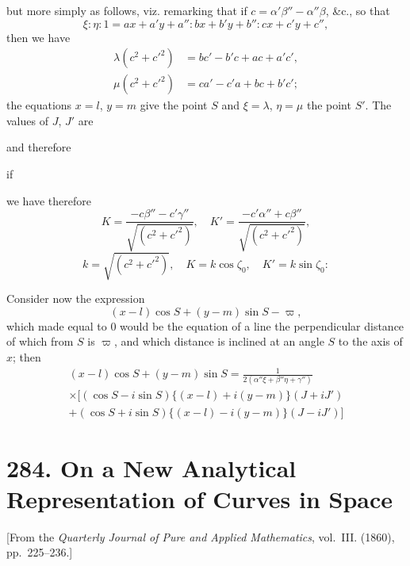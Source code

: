 \documentclass[11pt,a4paper]{book}
\begin{document}
but more simply as follows, viz. remarking that if $c = \alpha'\beta'' - \alpha''\beta$, \&c., so that
\[
\xi : \eta : 1 = ax + a'y + a'' : bx + b'y + b'' : cx + c'y + c'',
\]
then we have
\begin{align*}
\lambda(c^2 + c'^2) &= bc' - b'c + ac + a'c',\\
\mu(c^2 + c'^2) &= ca' - c'a + bc + b'c';
\end{align*}
the equations $x = l$, $y = m$ give the point $S$ and $\xi = \lambda$, $\eta = \mu$ the point $S'$. The values of $J$, $J'$ are

and therefore

if

we have therefore
\[
K = \frac{-c\beta'' - c'\gamma''}{\sqrt{(c^2 + c'^2)}},\quad K' = \frac{-c'\alpha'' + c\beta''}{\sqrt{(c^2 + c'^2)}},
\]
\[
k = \sqrt{(c^2 + c'^2)},\quad K = k\cos\zeta_0,\quad K' = k\sin\zeta_0:
\]

Consider now the expression
\[
(x - l)\cos S + (y - m)\sin S - \varpi,
\]
which made equal to 0 would be the equation of a line the perpendicular distance of which from $S$ is $\varpi$, and which distance is inclined at an angle $S$ to the axis of $x$; then
\begin{multline*}
(x - l)\cos S + (y - m)\sin S = \frac{1}{2(\alpha''\xi + \beta''\eta + \gamma'')}\\
\times[(\cos S - i\sin S)\{(x - l) + i(y - m)\}(J + iJ')\\
+ (\cos S + i\sin S)\{(x - l) - i(y - m)\}(J - iJ')]
\end{multline*}


\newpage
\section*{284. On a New Analytical Representation of Curves in Space}
\label{sec:284}

[From the \textit{Quarterly Journal of Pure and Applied Mathematics}, vol.~III. (1860), pp.~225--236.]
\end{document}
